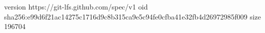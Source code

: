 version https://git-lfs.github.com/spec/v1
oid sha256:e99d6f21ac14275c1716d9c8b315ca9e5c94fe0cfba41e32fb4d26972985f009
size 196704
